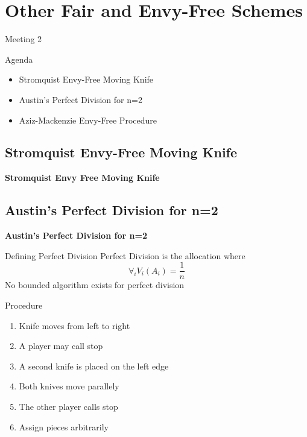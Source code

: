\documentclass[aspectratio=169,xcolor=dvipsnames]{beamer}
\begin{document}
\section{Other Fair and Envy-Free Schemes}
\begin{frame}{Meeting 2}
	\begin{block}{Agenda}
		\begin{itemize}
			\item Stromquist Envy-Free Moving Knife
			\item Austin's Perfect Division for n=2
			\item Aziz-Mackenzie Envy-Free Procedure
		\end{itemize}
	\end{block}
\end{frame}
\subsection{Stromquist Envy-Free Moving Knife}
\begin{frame}
\Huge{\centerline{\textbf{Stromquist Envy Free Moving Knife}}}
\end{frame}
\subsection{Austin's Perfect Division for n=2}
\begin{frame}
	\Huge{\centerline{\textbf{Austin's Perfect Division for n=2}}}
\end{frame}
\begin{frame}{Defining Perfect Division}
	Perfect Division is the allocation where
	\[\forall_i V_i(A_i) = \frac{1}{n}\]
	No bounded algorithm exists for perfect division
\end{frame}
\begin{frame}{Procedure}
	\begin{enumerate}
		\item Knife moves from left to right
		\item A player may call stop \pause
		\item A second knife is placed on the left edge
		\item Both knives move parallely
		\item The other player calls stop \pause
		\item Assign pieces arbitrarily
	\end{enumerate}
\end{frame}
\end{document}
